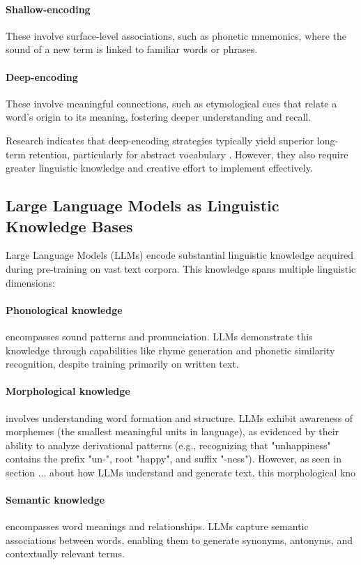 \documentclass{article}
\newcounter{para}
\begin{document}
\paragraph{Shallow-encoding} These involve surface-level associations, such as phonetic mnemonics, where the sound of a new term is linked to familiar words or phrases.
\paragraph{Deep-encoding} These involve meaningful connections, such as etymological cues that relate a word's origin to its meaning, fostering deeper understanding and recall.

Research indicates that deep-encoding strategies typically yield superior long-term retention, particularly for abstract vocabulary \citep{craik1975depth, atkinson1975mnemotechnics, oxford1990language}. However, they also require greater linguistic knowledge and creative effort to implement effectively.

\subsection{Large Language Models as Linguistic Knowledge Bases} \label{sec:llm-linguistics}

Large Language Models (LLMs) encode substantial linguistic knowledge acquired during pre-training on vast text corpora. This knowledge spans multiple linguistic dimensions:
\paragraph{Phonological knowledge} encompasses sound patterns and pronunciation. LLMs demonstrate this knowledge through capabilities like rhyme generation and phonetic similarity recognition, despite training primarily on written text.
\paragraph{Morphological knowledge} involves understanding word formation and structure. LLMs exhibit awareness of morphemes (the smallest meaningful units in language), as evidenced by their ability to analyze derivational patterns (e.g., recognizing that "unhappiness" contains the prefix "un-", root "happy", and suffix "-ness"). However, as seen in section ... about how LLMs understand and generate text, this morphological kno
\paragraph{Semantic knowledge} encompasses word meanings and relationships. LLMs capture semantic associations between words, enabling them to generate synonyms, antonyms, and contextually relevant terms.
\end{document}
